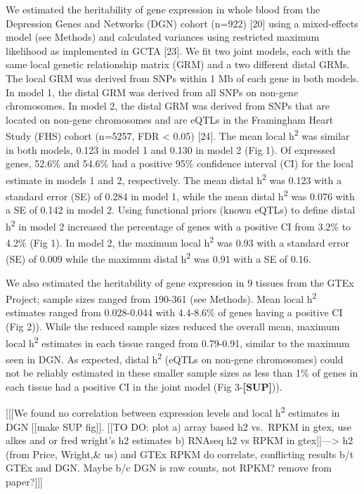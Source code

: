 \documentclass[]{article}
\begin{document}
We estimated the heritability of gene expression in whole blood from the
Depression Genes and Networks (DGN) cohort (n=922) {[}20{]} using a
mixed-effects model (see Methods) and calculated variances using
restricted maximum likelihood as implemented in GCTA {[}23{]}. We fit
two joint models, each with the same local genetic relationship matrix
(GRM) and a two different distal GRMs. The local GRM was derived from
SNPs within 1 Mb of each gene in both models. In model 1, the distal GRM
was derived from all SNPs on non-gene chromosomes. In model 2, the
distal GRM was derived from SNPs that are located on non-gene
chromosomes and are eQTLs in the Framingham Heart Study (FHS) cohort
(n=5257, FDR \textless{} 0.05) {[}24{]}. The mean local
h\textsuperscript{2} was similar in both models, 0.123 in model 1 and
0.130 in model 2 (Fig 1). Of expressed genes, 52.6\% and 54.6\% had a
positive 95\% confidence interval (CI) for the local estimate in models
1 and 2, respectively. The mean distal h\textsuperscript{2} was 0.123
with a standard error (SE) of 0.284 in model 1, while the mean distal
h\textsuperscript{2} was 0.076 with a SE of 0.142 in model 2. Using
functional priors (known eQTLs) to define distal h\textsuperscript{2} in
model 2 increased the percentage of genes with a positive CI from 3.2\%
to 4.2\% (Fig 1). In model 2, the maximum local h\textsuperscript{2} was
0.93 with a standard error (SE) of 0.009 while the maximum distal
h\textsuperscript{2} was 0.91 with a SE of 0.16.

We also estimated the heritability of gene expression in 9 tissues from
the GTEx Project; sample sizes ranged from 190-361 (see Methods). Mean
local h\textsuperscript{2} estimates ranged from 0.028-0.044 with
4.4-8.6\% of genes having a positive CI (Fig 2)). While the reduced
sample sizes reduced the overall mean, maximum local
h\textsuperscript{2} estimates in each tissue ranged from 0.79-0.91,
similar to the maximum seen in DGN. As expected, distal
h\textsuperscript{2} (eQTLs on non-gene chromosomes) could not be
reliably estimated in these smaller sample sizes as less than 1\% of
genes in each tissue had a positive CI in the joint model (Fig
3-\textbf{{[}SUP{]}})).

{[}{[}{[}We found no correlation between expression levels and local
h\textsuperscript{2} estimates in DGN {[}{[}make SUP fig{]}{]}. {[}{[}TO
DO: plot a) array based h2 vs.~RPKM in gtex, use alkes and or fred
wright's h2 estimates b) RNAseq h2 vs RPKM in
gtex{]}{]}---\textgreater{} h2 (from Price, Wright,\& us) and GTEx RPKM
do correlate, conflicting results b/t GTEx and DGN. Maybe b/c DGN is raw
counts, not RPKM? remove from paper?{]}{]}{]}
\end{document}
